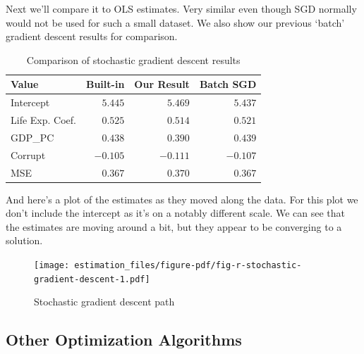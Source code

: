 \documentclass[
  letterpaper,
]{krantz}
\begin{document}
Next we'll compare it to OLS estimates. Very similar even though SGD
normally would not be used for such a small dataset. We also show our
previous `batch' gradient descent results for comparison.

\hypertarget{tbl-stochastic-gradient-descent}{}
\begin{longtable}{lrrr}
\caption{\label{tbl-stochastic-gradient-descent}Comparison of stochastic gradient descent results }\tabularnewline

\toprule
Value & Built-in & Our Result & Batch SGD \\ 
\midrule\addlinespace[2.5pt]
Intercept & \textcolor[HTML]{404040}{$5.445$} & \textcolor[HTML]{404040}{$5.469$} & \textcolor[HTML]{404040}{$5.437$} \\ 
Life Exp. Coef. & \textcolor[HTML]{404040}{$0.525$} & \textcolor[HTML]{404040}{$0.514$} & \textcolor[HTML]{404040}{$0.521$} \\ 
GDP\_PC & \textcolor[HTML]{404040}{$0.438$} & \textcolor[HTML]{404040}{$0.390$} & \textcolor[HTML]{404040}{$0.439$} \\ 
Corrupt & \textcolor[HTML]{404040}{$-0.105$} & \textcolor[HTML]{404040}{$-0.111$} & \textcolor[HTML]{404040}{$-0.107$} \\ 
MSE & \textcolor[HTML]{404040}{$0.367$} & \textcolor[HTML]{404040}{$0.370$} & \textcolor[HTML]{404040}{$0.367$} \\ 
\bottomrule
\end{longtable}

And here's a plot of the estimates as they moved along the data. For
this plot we don't include the intercept as it's on a notably different
scale. We can see that the estimates are moving around a bit, but they
appear to be converging to a solution.

\begin{figure}

{\centering \texttt{[image: estimation\_files/figure-pdf/fig-r-stochastic-gradient-descent-1.pdf]}

}

\caption{\label{fig-r-stochastic-gradient-descent}Stochastic gradient
descent path}

\end{figure}

\subsection{Other Optimization
Algorithms}\label{sec-estim-opt-algos-other}
\end{document}
